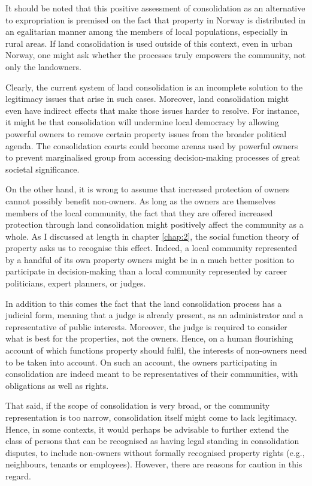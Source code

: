 It should be noted that this positive assessment of consolidation as an alternative to expropriation is  premised on the fact that property in Norway is distributed in an egalitarian manner among the members of local populations, especially in rural areas. If land consolidation is used outside of this context, even in urban Norway, one might ask whether the processes truly empowers the community, not only the landowners. 

Clearly, the current system of land consolidation is an incomplete solution to the legitimacy issues that arise in such cases. Moreover, land consolidation might even have indirect effects that make those issues harder to resolve. For instance, it might be that consolidation will undermine local democracy by allowing powerful owners to remove certain property issues from the broader political agenda. The consolidation courts could become arenas used by powerful owners to prevent marginalised group from accessing decision-making processes of great societal significance.

On the other hand, it is wrong to assume that increased protection of owners cannot possibly benefit non-owners. As long as the owners are themselves members of the local community, the fact that they are offered increased protection through land consolidation might positively affect the community as a whole. As I discussed at length in chapter \ref{chap:2}, the social function theory of property asks us to recognise this effect. Indeed, a local community represented by a handful of its own property owners might be in a much better position to participate in decision-making than a local community represented by career politicians, expert planners, or judges.

In addition to this comes the fact that the land consolidation process has a judicial form, meaning that a judge is already present, as an administrator and a representative of public interests. Moreover, the judge is required to consider what is best for the properties, not the owners. Hence, on a human flourishing account of which functions property should fulfil, the interests of non-owners need to be taken into account. On such an account, the owners participating in consolidation are indeed meant to be representatives of their communities, with obligations as well as rights.

That said, if the scope of consolidation is very broad, or the community representation is too narrow, consolidation itself might come to lack legitimacy. Hence, in some contexts, it would perhaps be advisable to further extend the class of persons that can be recognised as having legal standing in consolidation disputes, to include non-owners without formally recognised property rights (e.g., neighbours, tenants or employees). However, there are reasons for caution in this regard. 

